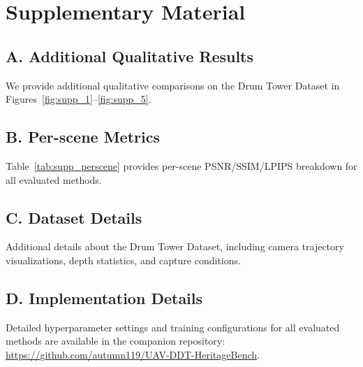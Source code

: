 \section*{Supplementary Material}
\label{sec:supplementary}

\subsection*{A. Additional Qualitative Results}

We provide additional qualitative comparisons on the Drum Tower Dataset
in Figures~\ref{fig:supp_1}--\ref{fig:supp_5}.


\subsection*{B. Per-scene Metrics}

Table~\ref{tab:supp_perscene} provides per-scene PSNR/SSIM/LPIPS
breakdown for all evaluated methods.


\subsection*{C. Dataset Details}

Additional details about the Drum Tower Dataset, including camera
trajectory visualizations, depth statistics, and capture conditions.


\subsection*{D. Implementation Details}

Detailed hyperparameter settings and training configurations for all
evaluated methods are available in the companion repository:
\url{https://github.com/autumn119/UAV-DDT-HeritageBench}.
